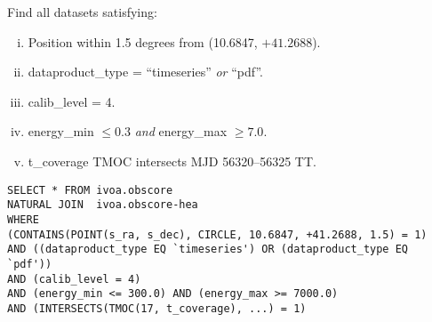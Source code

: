 \medskip
\noindent Find all datasets satisfying:
\begin{enumerate}[(i)]
  \item Position within 1.5 degrees from (10.6847, $+41.2688$).
  \item dataproduct\_type = ``timeseries'' {\em or\/} ``pdf''.
  \item calib\_level = 4.
  \item energy\_min $\leq 0.3$ {\em and\/} energy\_max $\geq 7.0$.
  \item t\_coverage TMOC intersects MJD 56320--56325 TT.
\end{enumerate}


\begin{verbatim}
SELECT * FROM ivoa.obscore
NATURAL JOIN  ivoa.obscore-hea 
WHERE
(CONTAINS(POINT(s_ra, s_dec), CIRCLE, 10.6847, +41.2688, 1.5) = 1) 
AND ((dataproduct_type EQ `timeseries') OR (dataproduct_type EQ `pdf'))
AND (calib_level = 4)
AND (energy_min <= 300.0) AND (energy_max >= 7000.0)
AND (INTERSECTS(TMOC(17, t_coverage), ...) = 1)
\end{verbatim}
